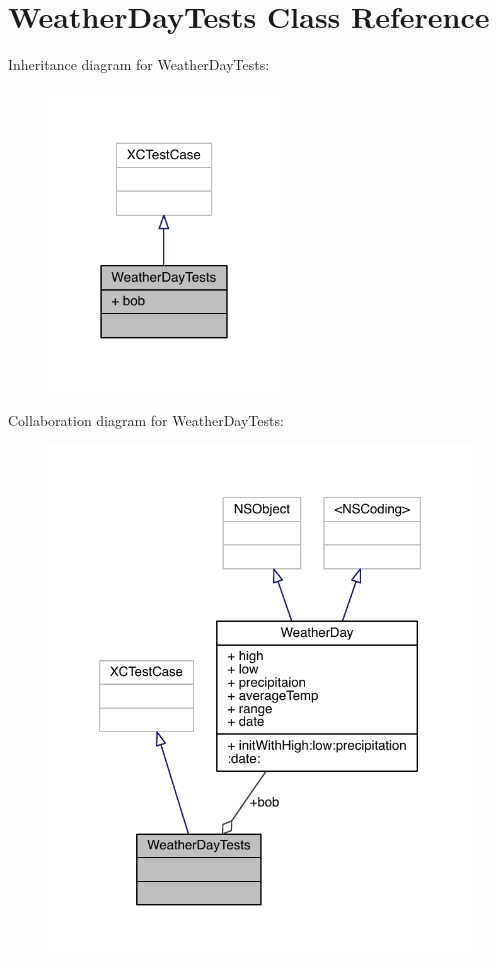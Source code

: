 \hypertarget{interface_weather_day_tests}{\section{Weather\-Day\-Tests Class Reference}
\label{interface_weather_day_tests}
}


Inheritance diagram for Weather\-Day\-Tests\-:\nopagebreak
\begin{figure}[H]
\begin{center}
\leavevmode
\includegraphics[width=174pt]{interface_weather_day_tests__inherit__graph}
\end{center}
\end{figure}


Collaboration diagram for Weather\-Day\-Tests\-:\nopagebreak
\begin{figure}[H]
\begin{center}
\leavevmode
\includegraphics[width=323pt]{interface_weather_day_tests__coll__graph}
\end{center}
\end{figure}
